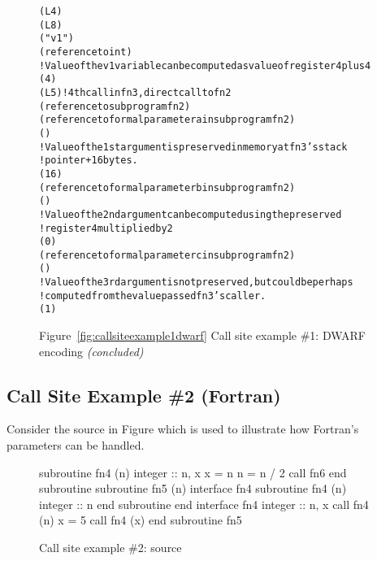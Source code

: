 \begin{figure}
\begin{dwflisting}
\begin{alltt}
\DWTAGlexicalblock
    \DWATlowpc(L4)
    \DWAThighpc(L8)
    \DWTAGvariable
        \DWATname("v1")
        \DWATtype(reference to int)
        ! Value of the v1 variable can be computed as value of register 4 plus 4
        \DWATlocation(\DWOPbregfour{} 4 \DWOPstackvalue)
    \DWTAGcallsite
        \DWATcallreturnpc(L5) ! 4th call in fn3, direct call to fn2
        \DWATcalltarget(reference to subprogram fn2)
        \DWTAGcallsiteparameter
            \DWATcallparameter(reference to formal parameter a in subprogram fn2)
            \DWATlocation(\DWOPregzero)
            ! Value of the 1st argument is preserved in memory at fn3's stack 
            !   pointer + 16 bytes.
            \DWATcallvalue(\DWOPbregthree{} 16 \DWOPderef)
        \DWTAGcallsiteparameter
            \DWATcallparameter(reference to formal parameter b in subprogram fn2)
            \DWATlocation(\DWOPregone)
            ! Value of the 2nd argument can be computed using the preserved 
            !   register 4 multiplied by 2
            \DWATcallvalue(\DWOPlittwo{} \DWOPregfour{} 0 \DWOPmul)
        \DWTAGcallsiteparameter
            \DWATcallparameter(reference to formal parameter c in subprogram fn2)
            \DWATlocation(\DWOPregtwo)
            ! Value of the 3rd argument is not preserved, but could be perhaps 
            ! computed from the value passed fn3's caller.
            \DWATcallvalue(\DWOPentryvalue{} 1 \DWOPregzero)
\end{alltt}
\end{dwflisting}
\begin{center}
\vspace{3mm}
Figure~\ref{fig:callsiteexample1dwarf} Call site example \#1: DWARF encoding \textit{(concluded)}
\end{center}
\end{figure}

\clearpage
\subsection{Call Site Example \#2 (Fortran)}
Consider the  source in 
Figure 
which is used to illustrate how Fortran's 
parameters can be handled.

\begin{figure}[ht]
\begin{nlnlisting}
subroutine fn4 (n)
    integer :: n, x
    x = n
    n = n / 2
    call fn6
end subroutine
subroutine fn5 (n)
    interface fn4
        subroutine fn4 (n)
            integer :: n
        end subroutine
    end interface fn4
    integer :: n, x
    call fn4 (n)
    x = 5
    call fn4 (x)
end subroutine fn5
\end{nlnlisting}
\caption{Call site example \#2: source}
\label{fig:callsiteexample2source}
\end{figure}

